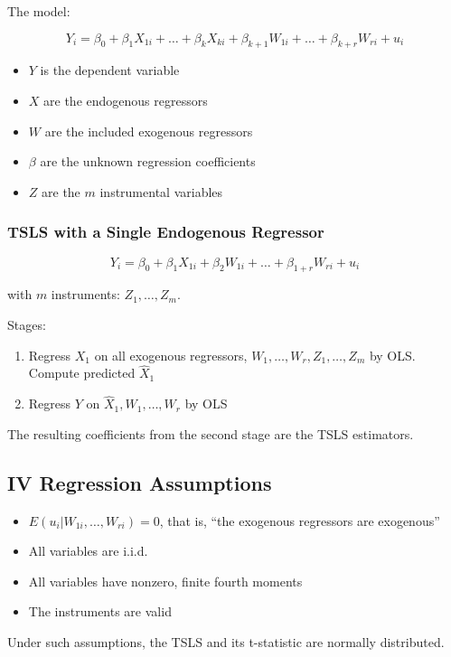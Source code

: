 \documentclass{article}
\begin{document}
The model:

\[
	Y_i = \beta_0 + \beta_1 X_{1i} + \ldots + \beta_k X_{ki} + \beta_{k+1} W_{1i} + \ldots
	+ \beta_{k+r} W_{ri} + u_i
\]

\begin{itemize}
	\item $Y$ is the dependent variable
	\item $X$ are the endogenous regressors
	\item $W$ are the included exogenous regressors
	\item $\beta$ are the unknown regression coefficients
	\item $Z$ are the $m$ instrumental variables
\end{itemize}

\subsubsection{TSLS with a Single Endogenous Regressor}

\[
	Y_i = \beta_0 + \beta_1 X_{1i} + \beta_2 W_{1i} + \ldots + \beta_{1+r} W_{ri} + u_i
\]

with $m$ instruments: $Z_1, \ldots, Z_m$.

Stages:
\begin{enumerate}
	\item Regress $X_1$ on all exogenous regressors, $W_1, \ldots, W_r, Z_1, \ldots, Z_m$ by OLS.
					Compute predicted $\hat{X}_1$
	\item Regress $Y$ on $\hat{X}_1, W_1, \ldots, W_r$ by OLS
\end{enumerate}

The resulting coefficients from the second stage are the TSLS estimators.

\subsection{IV Regression Assumptions}

\begin{itemize}
	\item $E(u_i|W_{1i},\ldots,W_{ri}) = 0$, that is, ``the exogenous regressors are exogenous''
	\item All variables are i.i.d.
	\item All variables have nonzero, finite fourth moments
	\item The instruments are valid
\end{itemize}

Under such assumptions, the TSLS and its t-statistic are normally distributed.
\end{document}
